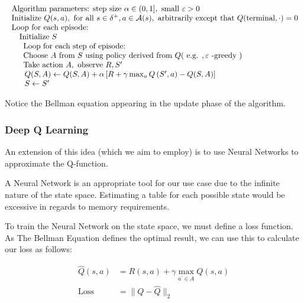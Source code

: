 \documentclass[12pt]{article}
\begin{document}
$$
\begin{array} { l } { \text { Algorithm parameters: step size } \alpha \in ( 0,1 ] , \text { small } \varepsilon > 0 } \\ { \text { Initialize } Q ( s , a ) , \text { for all } s \in \delta ^ { + } , a \in \mathcal { A } ( s ) , \text { arbitrarily except that } Q ( \text {terminal} , \cdot ) = 0 }  \\
\text{ Loop for each episode:} \\
\quad\text{ Initialize } S \\
\indent \text{ Loop for each step of episode:} \\
 \indent{ \text { Choose } A \text { from } S \text { using policy derived from } Q ( \text { e.g. } , \varepsilon \text { -greedy } ) } \\ \indent{ \text { Take action } A , \text { observe } R , S ^ { \prime } } \\ \indent { \hphantom{1}Q ( S , A ) \leftarrow Q ( S , A ) + \alpha \left[ R + \gamma \max _ { a } Q \left( S ^ { \prime } , a \right) - Q ( S , A ) \right] } \\ \indent{ \hphantom{1} S \leftarrow S ^ { \prime } }\\
\end{array}
$$ 


Notice the Bellman equation appearing in the update phase of the algorithm.

\subsubsection{Deep Q Learning}
An extension of this idea (which we aim to employ) is to use Neural Networks to approximate the Q-function.

A Neural Network is an appropriate tool for our use case due to the infinite nature of the state space. Estimating a table for each possible state would be excessive in regards to memory requirements.

To train the Neural Network on the state space, we must define a loss function. As The Bellman Equation defines the optimal result, we can use this to calculate our loss as follows:

$$
\begin{aligned}
\hat { Q } ( s , a ) &= R ( s , a ) + \gamma \max _ { a ^ { \prime } \in A } Q ( s , a ) \\
\text {Loss} &= \| Q - \hat { Q } \| _ { 2 }
\end{aligned}
$$
\end{document}
